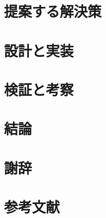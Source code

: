 \documentclass[a4paper]{jreport}
\begin{document}
\chapter{提案する解決策}


\chapter{設計と実装}


\chapter{検証と考察}


\chapter{結論}


\chapter{謝辞}

\chapter{参考文献}


\begin{comment}
流れ
序論
・IoTが流行している。
  ->何故？
	・コンピューターの高性能化と価格の低下 -> ほんとに？
	・家庭へのインターネットの普及 -> ほんとに？
  -> ほんとに？

・IoTのデバイス監視で困っている。
  -> デバイスの監視が本当に必要なのか？
	・サービスを止めないために必要 -> ほんとに？
  -> 何故デバイスの監視で困っているのか？
	・見に行くわけに行かない。
	  ->何故？
		・設置場所が離れていることがある。-> ほんとに？
		・数が多くて見きれない。 -> ほんとに？
	・サービスに組み込むのにも手間がかかる -> ほんとに？
  -> ほんとに？

提案
・IoT機器向けの機器監視サービスを作ったら、楽になるのでは？
  -> 他の解決策はどうなの？何がダメなの？
	・Ping
	・SNMP
	・Influxdb...
	・Elasticksearch...
  -> 他のがダメなのに、コレが何故OKなの？
	・IoTサービスの開発に特化しているため
	  ->どう特化してるの？
		・グラフ作成等の手間が不要
		・一覧して見ることができる
		・機器から通知が送られてくるので、NAPTで突っかからない。
  -> ほんとに？=>検証へ

検証
・田頭さんの研究で使ってもらい評価を得る。
　1. 使い方について簡単に説明
　2. 使っている様子を観測
  3. 最後に聞き取りを実施
-> なんだって？
　・こんな意見が聞けた。
　・サービスについては、〇〇だと言われた。
　・観察している中で、こんな所が気になった。

結論
・確かに楽になった or 楽にならなかった。
 -> 何故？

今後の課題としてこんなことがあった。
 ・
\end{comment}
\end{document}
